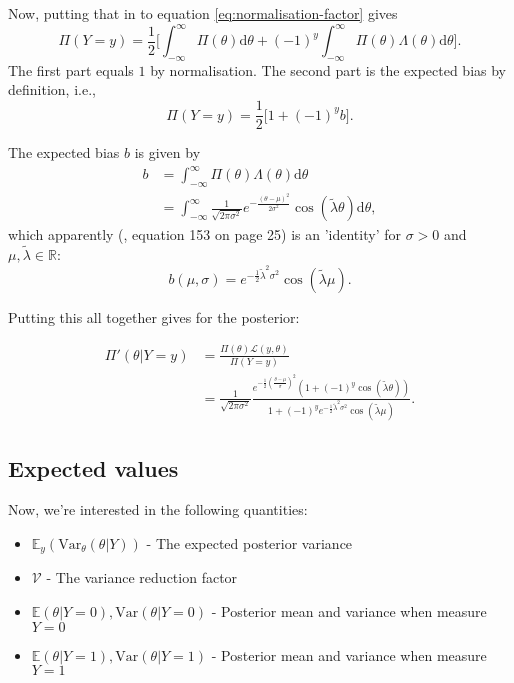 \documentclass[]{report}
\begin{document}
Now, putting that in to equation \eqref{eq:normalisation-factor} gives
\begin{equation}
    \Pi(Y=y) = \frac{1}{2} \Big[ \int_{-\infty}^{\infty} \Pi(\theta) \text{d}\theta + (-1)^y \int_{-\infty}^{\infty} \Pi(\theta) \Lambda (\theta) \text{d} \theta \Big].
\end{equation}
The first part equals $1$ by normalisation. The second part is the expected bias by definition, i.e.,
\begin{equation}
     \Pi(Y=y) = \frac{1}{2} \Big[ 1 + (-1)^y b\Big].
\end{equation}

The expected bias $b$ is given by
\begin{align}
    b   &= \int_{-\infty}^{\infty} \Pi(\theta) \Lambda (\theta) \text{d} \theta\\
        &= \int_{-\infty}^{\infty} \frac{1}{\sqrt{2\pi \sigma^2}} e^{-\frac{(\theta - \mu)^2}{2\sigma^2}} \cos(\tilde{\lambda} \theta) \text{d} \theta,
\end{align}
which apparently (\cite{Koh2020}, equation 153 on page 25) is an 'identity' for $\sigma > 0$ and $\mu, \tilde{\lambda} \in \mathbb{R}$:
\begin{equation}
\label{eq:b-gaussian}
    b(\mu, \sigma) = e^{-\frac{1}{2}\tilde{\lambda}^2\sigma^2} \cos (\tilde{\lambda} \mu).
\end{equation}


Putting this all together gives for the posterior:

\begin{align}
    \Pi'(\theta|Y = y)  &= \frac{\Pi(\theta) \mathcal{L} (y, \theta)}{\Pi(Y=y)}\\
    &= \frac{1}{\sqrt{2\pi \sigma^2}}\frac{e^{-\frac{1}{2}(\frac{\theta - \mu}{\sigma})^2} ( 1 + (-1)^y \cos(\tilde{\lambda} \theta))}{1 + (-1)^y e^{-\frac{1}{2}\tilde{\lambda}^2\sigma^2} \cos (\tilde{\lambda} \mu)}.
\end{align}

\subsection{Expected values}
Now, we're interested in the following quantities:
\begin{itemize}
    \item $\mathbb{E}_y(\text{Var}_{\theta}(\theta | Y))$ - The expected posterior variance
    \item $\mathcal{V}$ - The variance reduction factor
    \item $\mathbb{E}(\theta | Y=0), \text{Var}(\theta|Y=0)$ - Posterior mean and variance when measure $Y=0$
    \item $\mathbb{E}(\theta | Y=1), \text{Var}(\theta|Y=1)$ - Posterior mean and variance when measure $Y=1$
\end{itemize}
\end{document}

